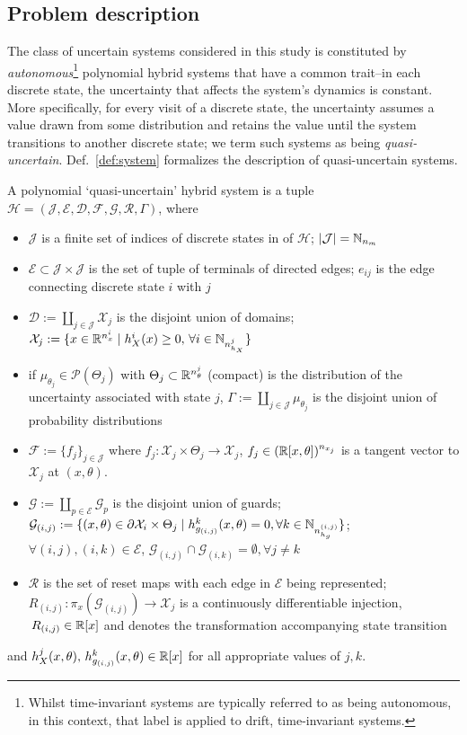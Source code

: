   \subsection{Problem description}
  The class of uncertain systems considered in this study is constituted by \emph{autonomous}\footnote{Whilst time-invariant systems are typically referred to as being autonomous, in this context, that label is applied to drift, time-invariant systems.} polynomial hybrid systems that have a common trait--in each discrete state, the uncertainty that affects the system's dynamics is constant. More specifically, for every visit of a discrete state, the uncertainty assumes a value drawn from some distribution and retains the value until the system transitions to another discrete state; we term such systems as being \emph{quasi-uncertain}. Def.~\ref{def:system} formalizes the description of quasi-uncertain systems.
\begin{defn}\label{def:system}
  A polynomial `quasi-uncertain' hybrid system is a tuple \mbox{$\mathcal H=(\mathcal J,\mathcal E,\mathcal D,\mathcal F,\mathcal G,\mathcal R,\Gamma)$}, where
  \begin{itemize}
    \item $\mathcal J$ is a finite set of indices of discrete states in of $\mathcal H$; $|\mathcal J|=\mathbb{N}_{n_m}$
    \item $\mathcal E\subset \mathcal J\times \mathcal J$ is the set of tuple of terminals of directed edges; $e_{ij}$ is the edge connecting discrete state $i$ with $j$
    \item $\mathcal D:=\coprod_{j\in\mathcal J} \mathcal X_j$ is the disjoint union of domains; \mbox{$\mathcal X_j:=\{x\in \mathbb{R}^{n_{x}^i}\mid h_{X}^i(x)\ge 0,\,\forall i\in \mathbb{N}_{n_{h_X}^j}\}$}
    \item if $\mu_{\theta_j}\in \mathcal P(\Theta_j)$ with  $\Theta_j\subset \mathbb{R}^{n_\theta^j}$ (compact) is the distribution of the uncertainty associated with state $j$, $\Gamma:=\coprod_{j\in \mathcal J} \mu_{\theta_j}$ is the disjoint union of probability distributions
    \item $\mathcal F:=\{f_j\}_{j\in \mathcal J}$ where $f_j\colon \mathcal X_j\times \Theta_j\rightarrow \mathcal X_j$, \mbox{$f_j\in (\mathbb{R}[x,\theta])^{n_{x_j}}$} is a tangent vector to $\mathcal X_j$ at $(x,\theta)$.
    \item $\mathcal G:=\coprod_{p\in \mathcal E}\mathcal G_p$ is the disjoint union of guards; \mbox{\footnotesize$\mathcal G_{(i,j)}:=\{(x,\theta)\in \partial \mathcal X_i\times \Theta_j\mid h_{g_{(i,j)}}^k(x,\theta)=0,\forall k\in \mathbb{N}_{n_{h_g}^{(i,j)}}\}$}; $\forall (i,j),(i,k)\in \mathcal E$,
        $\mathcal G_{(i,j)}\cap \mathcal G_{(i,k)}=\emptyset, \forall j\ne k$
    \item $\mathcal R$ is the set of reset maps with each edge in $\mathcal E$ being represented; $R_{(i,j)}\colon \pi_{x}(\mathcal G_{(i,j)})\rightarrow \mathcal X_j$ is a continuously differentiable injection, $\,R_{(i,j)}\in \mathbb{R}[x]$ and denotes the transformation accompanying state transition
  \end{itemize}
  and $h_{X}^j(x,\theta),\,h_{g_{(i,j)}}^k(x,\theta)\in \mathbb{R}[x]$ for all appropriate values of $j,k$.
\end{defn}
